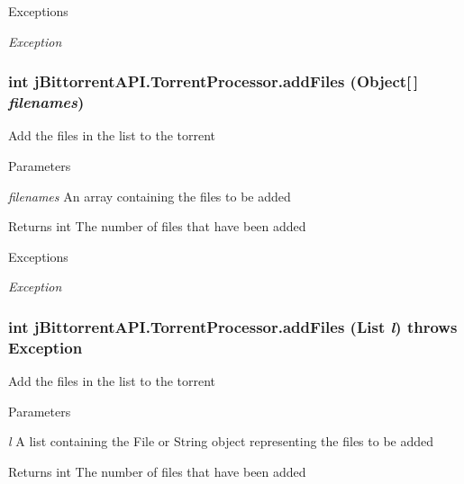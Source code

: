 \begin{DoxyExceptions}{Exceptions}
\item[{\em Exception}]\end{DoxyExceptions}
\hypertarget{classj_bittorrent_a_p_i_1_1_torrent_processor_af298f29e3f28860a023c85e0b18e2470}{
\subsubsection[{addFiles}]{\setlength{\rightskip}{0pt plus 5cm}int jBittorrentAPI.TorrentProcessor.addFiles (Object\mbox{[}$\,$\mbox{]} {\em filenames})}}
\label{classj_bittorrent_a_p_i_1_1_torrent_processor_af298f29e3f28860a023c85e0b18e2470}
Add the files in the list to the torrent 
\begin{DoxyParams}{Parameters}
\item[{\em filenames}]An array containing the files to be added \end{DoxyParams}
\begin{DoxyReturn}{Returns}
int The number of files that have been added 
\end{DoxyReturn}

\begin{DoxyExceptions}{Exceptions}
\item[{\em Exception}]\end{DoxyExceptions}
\hypertarget{classj_bittorrent_a_p_i_1_1_torrent_processor_a43ee5328989242c3b453154788cee1ec}{
\subsubsection[{addFiles}]{\setlength{\rightskip}{0pt plus 5cm}int jBittorrentAPI.TorrentProcessor.addFiles (List {\em l})  throws Exception }}
\label{classj_bittorrent_a_p_i_1_1_torrent_processor_a43ee5328989242c3b453154788cee1ec}
Add the files in the list to the torrent 
\begin{DoxyParams}{Parameters}
\item[{\em l}]A list containing the File or String object representing the files to be added \end{DoxyParams}
\begin{DoxyReturn}{Returns}
int The number of files that have been added 
\end{DoxyReturn}

